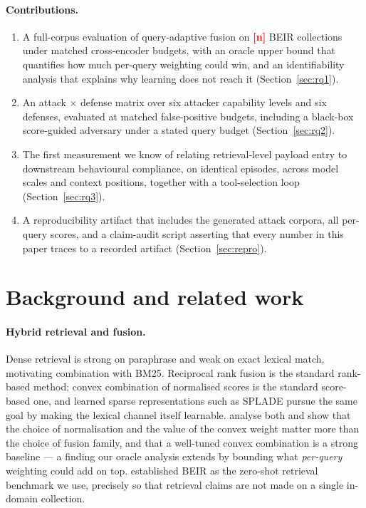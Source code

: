 \documentclass{article}
\providecommand{\PENDING}[1]{\textcolor{red}{\textbf{[#1]}}}
\newcommand{\nBeirCorpora}{\PENDING{n}}
\begin{document}
\paragraph{Contributions.}
\begin{enumerate}
\item A full-corpus evaluation of query-adaptive fusion on \nBeirCorpora{} BEIR
  collections under matched cross-encoder budgets, with an oracle upper bound
  that quantifies how much per-query weighting could win, and an identifiability
  analysis that explains why learning does not reach it
  (Section~\ref{sec:rq1}).
\item An attack $\times$ defense matrix over six attacker capability levels and
  six defenses, evaluated at matched false-positive budgets, including a
  black-box score-guided adversary under a stated query budget
  (Section~\ref{sec:rq2}).
\item The first measurement we know of relating retrieval-level payload entry to
  downstream behavioural compliance, on identical episodes, across model scales
  and context positions, together with a tool-selection loop
  (Section~\ref{sec:rq3}).
\item A reproducibility artifact that includes the generated attack corpora, all
  per-query scores, and a claim-audit script asserting that every number in this
  paper traces to a recorded artifact (Section~\ref{sec:repro}).
\end{enumerate}

\section{Background and related work}

\paragraph{Hybrid retrieval and fusion.} Dense retrieval \citep{karpukhin2020dpr}
is strong on paraphrase and weak on exact lexical match, motivating combination
with BM25. Reciprocal rank fusion \citep{cormack2009rrf} is the standard
rank-based method; convex combination of normalised scores is the standard
score-based one, and learned sparse representations such as SPLADE
\citep{formal2021splade} pursue the same goal by making the lexical channel
itself learnable. \citet{bruch2023fusion} analyse both and show that the choice
of normalisation and the value of the convex weight matter more than the choice
of fusion family, and that a well-tuned convex combination is a strong baseline
--- a finding our oracle analysis extends by bounding what \emph{per-query}
weighting could add on top. \citet{thakur2021beir} established BEIR as the
zero-shot retrieval benchmark we use, precisely so that retrieval claims are not
made on a single in-domain collection.
\end{document}
